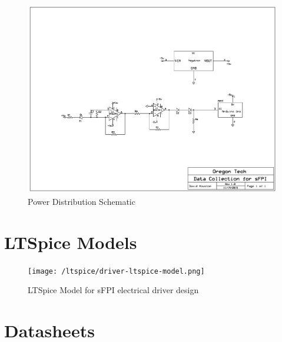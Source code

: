 \documentclass[12pt,journal]{IEEEtran}
\begin{document}
\begin{appendices}
\begin{figure}[h!]
	\includegraphics[width=\textwidth]{schematic-power.png}
	\caption[Photodiode Output Circuit]{Power Distribution Schematic}
	\label{schm:power-distribution}
\end{figure}
\newpage

\section{LTSpice Models} \label{ss:ltpsice-models}

\begin{figure}[h!]
	\centering
	\texttt{[image: /ltspice/driver-ltspice-model.png]}
	\caption{LTSpice Model for sFPI electrical driver design}
	\label{ltpsice:driver}
\end{figure}

\newpage

\section{Datasheets}

%

%

 \label{datasheet:nte941m}

 \label{datasheet:nte957}

 \label{datasheet:mcp4725}

 \label{datasheet:arduino_uno}

 \label{datasheet:psin02512n}

\end{appendices}
\end{document}
